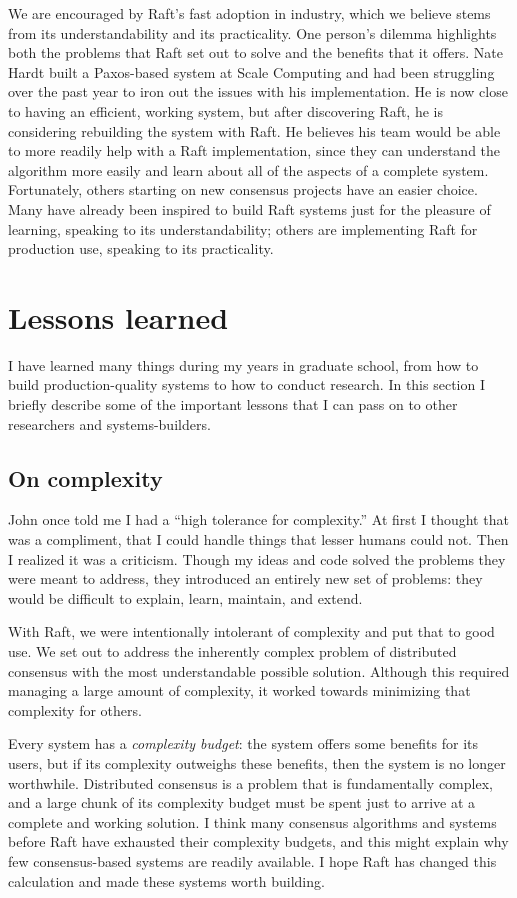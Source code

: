 We are encouraged by Raft's fast adoption in industry, which we believe
stems from its understandability and its practicality. One person's
dilemma highlights both the problems that Raft set out to solve and the
benefits that it offers. Nate Hardt
built a Paxos-based system at Scale Computing
and had been struggling over the past year to iron out the issues with
his implementation. He is now close to having an efficient, working
system, but after discovering Raft, he is considering rebuilding the
system with Raft. He believes his team would be able to more readily
help with a Raft implementation, since they can understand the algorithm
more easily and learn about all of the aspects of a complete system.
Fortunately, others starting on new consensus projects have an easier
choice. Many have already been inspired to build Raft systems just for
the pleasure of learning, speaking to its understandability; others are
implementing Raft for production use, speaking to its practicality.


\section{Lessons learned}


I have learned many things during my years in graduate school, from how
to build production-quality systems to how to conduct research. In this
section I briefly describe some of the important lessons that I can pass
on to other researchers and systems-builders.

\subsection{On complexity}

John once told me I had a ``high tolerance for complexity.'' At first I
thought that was a compliment, that I could handle things that lesser
humans could not. Then I realized it was a criticism. Though my ideas
and code solved the problems they were meant to address, they introduced
an entirely new set of problems: they would be difficult to explain,
learn, maintain, and extend.

With Raft, we were intentionally intolerant of complexity and
put that to good use. We set out to address the inherently complex problem
of distributed consensus with the most understandable possible solution.
Although this required managing a large amount of complexity, it worked
towards minimizing that complexity for others.

Every system has a \emph{complexity budget}: the system offers some
benefits for its users, but if its complexity outweighs these benefits,
then the system is no longer worthwhile.
Distributed consensus is a problem that is fundamentally complex, and a
large chunk of its complexity budget must be spent just to arrive at a
complete and working solution. I think many consensus algorithms and
systems before Raft have exhausted their complexity budgets, and this
might explain why few consensus-based systems are readily available. I
hope Raft has changed this calculation and made these systems worth
building.

